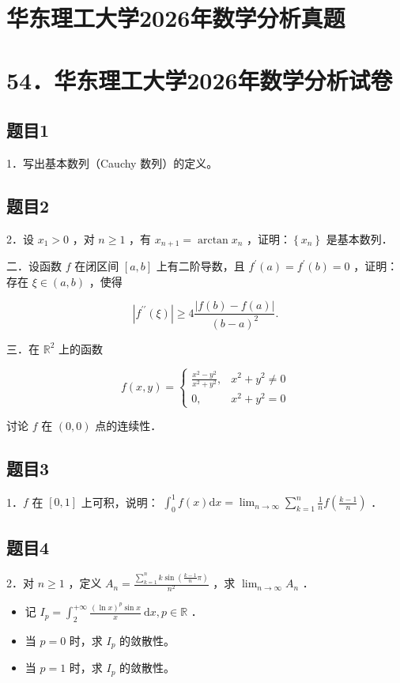 \documentclass{article}
\begin{document}
\section*{华东理工大学2026年数学分析真题}
\section*{54．华东理工大学2026年数学分析试卷}

\subsection{题目1}
1．写出基本数列（Cauchy 数列）的定义。

\subsection{题目2}
2．设 \(x_{1}>0\) ，对 \(n \geq 1\) ，有 \(x_{n+1}=\arctan x_{n}\) ，证明：\(\left\{x_{n}\right\}\) 是基本数列．

二．设函数 \(f\) 在闭区间 \([a, b]\) 上有二阶导数，且 \(f^{\prime}(a)=f^{\prime}(b)=0\) ，证明：存在 \(\xi \in(a, b)\) ，使得

\[
\left|f^{\prime \prime}(\xi)\right| \geq 4 \frac{|f(b)-f(a)|}{(b-a)^{2}} .
\]

三．在 \(\mathbb{R}^{2}\) 上的函数

\[
f(x, y)= \begin{cases}\frac{x^{2}-y^{2}}{x^{2}+y^{2}}, & x^{2}+y^{2} \neq 0 \\ 0, & x^{2}+y^{2}=0\end{cases}
\]

讨论 \(f\) 在 \((0,0)\) 点的连续性．

\subsection{题目3}
1．\(f\) 在 \([0,1]\) 上可积，说明： \(\int_{0}^{1} f(x) \mathrm{d} x=\lim _{n \rightarrow \infty} \sum_{k=1}^{n} \frac{1}{n} f\left(\frac{k-1}{n}\right)\) ．

\subsection{题目4}
2．对 \(n \geq 1\) ，定义 \(A_{n}=\frac{\sum_{k=1}^{n} k \sin \left(\frac{k-1}{n} \pi\right)}{n^{2}}\) ，求 \(\lim _{n \rightarrow \infty} A_{n}\) ．

\begin{itemize}
  \item[五．] 记 \(I_{p}=\int_{2}^{+\infty} \frac{(\ln x)^{p} \sin x}{x} \mathrm{~d} x, p \in \mathbb{R}\) ．

  \item[1．] 当 \(p=0\) 时，求 \(I_{p}\) 的敛散性。

  \item[2．] 当 \(p=1\) 时，求 \(I_{p}\) 的敛散性。
\end{itemize}
\end{document}
